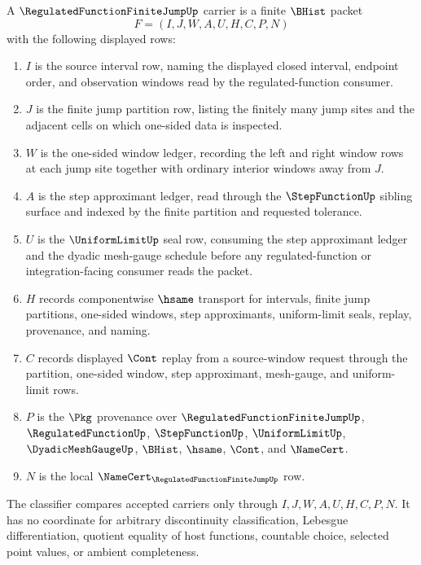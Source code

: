 \begin{definition}
\label{def:regulated-function-finite-jump-carrier}
A $\RegulatedFunctionFiniteJumpUp$ carrier is a finite $\BHist$ packet
$$
F=(I,J,W,A,U,H,C,P,N)
$$
with the following displayed rows:
\begin{enumerate}
\item $I$ is the source interval row, naming the displayed closed interval, endpoint order, and observation windows read by the regulated-function consumer.
\item $J$ is the finite jump partition row, listing the finitely many jump sites and the adjacent cells on which one-sided data is inspected.
\item $W$ is the one-sided window ledger, recording the left and right window rows at each jump site together with ordinary interior windows away from $J$.
\item $A$ is the step approximant ledger, read through the $\StepFunctionUp$ sibling surface and indexed by the finite partition and requested tolerance.
\item $U$ is the $\UniformLimitUp$ seal row, consuming the step approximant ledger and the dyadic mesh-gauge schedule before any regulated-function or integration-facing consumer reads the packet.
\item $H$ records componentwise $\hsame$ transport for intervals, finite jump partitions, one-sided windows, step approximants, uniform-limit seals, replay, provenance, and naming.
\item $C$ records displayed $\Cont$ replay from a source-window request through the partition, one-sided window, step approximant, mesh-gauge, and uniform-limit rows.
\item $P$ is the $\Pkg$ provenance over $\RegulatedFunctionFiniteJumpUp$, $\RegulatedFunctionUp$, $\StepFunctionUp$, $\UniformLimitUp$, $\DyadicMeshGaugeUp$, $\BHist$, $\hsame$, $\Cont$, and $\NameCert$.
\item $N$ is the local $\NameCert_{\RegulatedFunctionFiniteJumpUp}$ row.
\end{enumerate}
The classifier compares accepted carriers only through $I,J,W,A,U,H,C,P,N$. It has no coordinate for arbitrary discontinuity classification, Lebesgue differentiation, quotient equality of host functions, countable choice, selected point values, or ambient completeness.
\end{definition}

